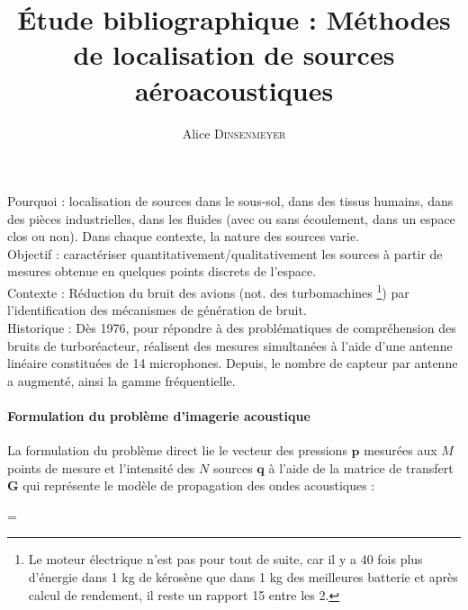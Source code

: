 \documentclass[twocolumn, 11pt]{article}
\title{
\centering \fontsize{18pt}{10pt}\textbf{Étude bibliographique : Méthodes de localisation de sources aéroacoustiques}
}
\author{
\large{Alice \textsc{Dinsenmeyer}}\\[2mm] %
\vspace{-5mm}
}
\date{}
\renewenvironment{equation}{\vspace{-0.2cm}\begin{oldequation}}{\vspace{-0.2cm}\end{oldequation}}
\begin{document}
\maketitle %

\thispagestyle{fancy} %




Pourquoi : localisation de sources dans le sous-sol, dans des tissus humains, dans des pièces industrielles, dans les fluides (avec ou sans écoulement, dans un espace clos ou non). Dans chaque contexte, la nature des sources varie.\\

Objectif : caractériser quantitativement/qualitativement les sources à partir de mesures obtenue en quelques points  discrets de l'espace.\\

Contexte : Réduction du bruit des avions (not. des turbomachines \footnote{Le moteur électrique n'est pas pour tout de suite, car il y a 40 fois plus d'énergie dans 1 kg de kérosène que dans 1 kg des meilleures batterie et après calcul de rendement, il reste un rapport 15 entre les 2.}) par l'identification des mécanismes de génération de bruit.\\

Historique : Dès 1976, pour répondre à des problématiques de compréhension des bruits de turboréacteur, \cite{Billingsley1976} réalisent des mesures simultanées à l'aide d'une antenne linéaire constituées de 14 microphones. Depuis, le nombre de capteur par antenne a augmenté, ainsi la gamme fréquentielle.


\paragraph{Formulation du problème d'imagerie acoustique}
La formulation du problème direct lie le vecteur des pressions $\bm{p}$ mesurées aux $M$ points de mesure et l'intensité des $N$ sources $\bm{q}$ à l'aide de la matrice de transfert $\bm{G}$ qui représente le modèle de propagation des ondes acoustiques : 
\begin{equation}
=
\end{equation}
\end{document}
